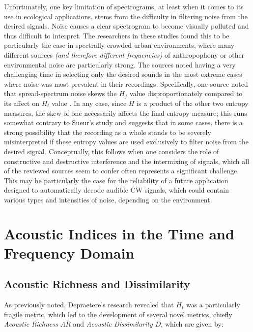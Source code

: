 \documentclass[letterpaper, 12 pt, conference]{ieeeconf}
\begin{document}
    Unfortunately, one key limitation of spectrograms, at least when it comes to its use in ecological applications, stems from the difficulty in filtering noise from the desired signals. Noise causes a clear spectrogram to become visually polluted and thus difficult to interpret. The researchers in these studies found this to be particularly the case in spectrally crowded urban environments, where many different sources \textit{(and therefore different frequencies)} of anthropophony or other environmental noise are particularly strong. The sources noted having a very challenging time in selecting only the desired sounds \autocite{zhao} in the most extreme cases where noise was most prevalent in their recordings. Specifically, one source noted that spread-spectrum noise skews the \textit{$H_f$} value disproportionately compared to its affect on \textit{$H_t$} value \autocite{Depraetere}. In any case, since \textit{$H$} is a product of the other two entropy measures, the skew of one necessarily affects the final entropy measure; this runs somewhat contrary to Sueur's study and suggests that in some cases, there is a strong possibility that the recording as a whole stands to be severely misinterpreted if these entropy values are used exclusively to filter noise from the desired signal. Conceptually, this follows when one considers the role of constructive and destructive interference and the intermixing of signals, which all of the reviewed sources seem to confer often represents a significant challenge. This may be particularly the case for the reliability of a future application designed to automatically decode audible CW signals, which could contain various types and intensities of noise, depending on the environment. 

\section{Acoustic Indices in the Time and Frequency Domain}

\subsection{Acoustic Richness and Dissimilarity}
    As previously noted, Depraetere's research revealed that \textit{$H_t$} was a particularly fragile metric, which led to the development of several novel metrics, chiefly \textit{Acoustic Richness $AR$} and \textit{Acoustic Dissimilarity $D$}, which are given by: 
\end{document}
